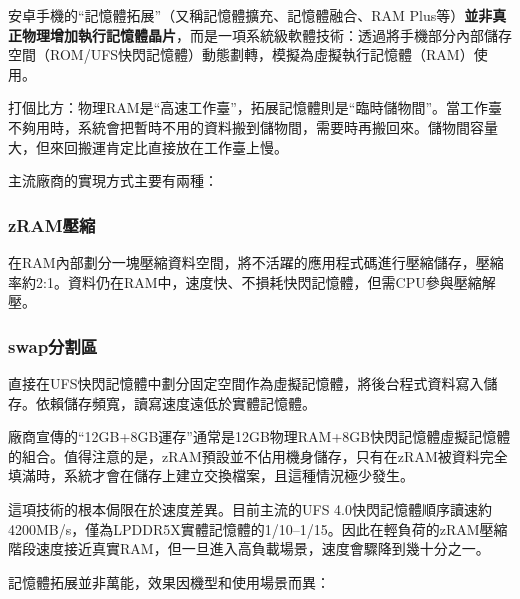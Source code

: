 


安卓手機的“記憶體拓展”（又稱記憶體擴充、記憶體融合、RAM Plus等）\textbf{並非真正物理增加執行記憶體晶片}，而是一項系統級軟體技術：透過將手機部分內部儲存空間（ROM/UFS快閃記憶體）動態劃轉，模擬為虛擬執行記憶體（RAM）使用。

打個比方：物理RAM是“高速工作臺”，拓展記憶體則是“臨時儲物間”。當工作臺不夠用時，系統會把暫時不用的資料搬到儲物間，需要時再搬回來。儲物間容量大，但來回搬運肯定比直接放在工作臺上慢。


主流廠商的實現方式主要有兩種：

\subsubsection*{zRAM壓縮}

在RAM內部劃分一塊壓縮資料空間，將不活躍的應用程式碼進行壓縮儲存，壓縮率約2:1。資料仍在RAM中，速度快、不損耗快閃記憶體，但需CPU參與壓縮解壓。

\subsubsection*{swap分割區}

直接在UFS快閃記憶體中劃分固定空間作為虛擬記憶體，將後台程式資料寫入儲存。依賴儲存頻寬，讀寫速度遠低於實體記憶體。

廠商宣傳的“12GB+8GB運存”通常是12GB物理RAM+8GB快閃記憶體虛擬記憶體的組合。值得注意的是，zRAM預設並不佔用機身儲存，只有在zRAM被資料完全填滿時，系統才會在儲存上建立交換檔案，且這種情況極少發生。


這項技術的根本侷限在於速度差異。目前主流的UFS 4.0快閃記憶體順序讀速約4200MB/s，僅為LPDDR5X實體記憶體的1/10–1/15。因此在輕負荷的zRAM壓縮階段速度接近真實RAM，但一旦進入高負載場景，速度會驟降到幾十分之一。


記憶體拓展並非萬能，效果因機型和使用場景而異：

